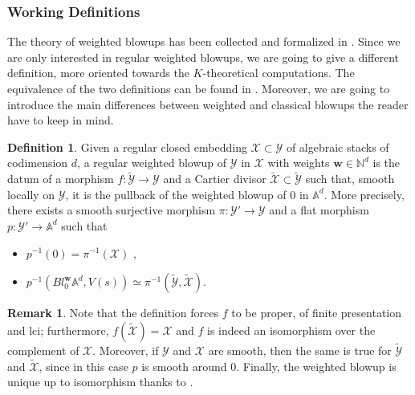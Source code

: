 \documentclass[12pt]{amsart}
\newcommand{\bA}{\mathbb{A}}
\newcommand{\bN}{\mathbb{N}}
\newcommand{\cX}{\mathcal{X}}
\newcommand{\cY}{\mathcal{Y}}
\theoremstyle{definition}
\newtheorem{Def}[theorem]{Definition}
\newtheorem{Rmk}[theorem]{Remark}
\begin{document}
\subsubsection{Working Definitions}

The theory of weighted blowups has been collected and formalized in \cite{quek-rydh-weighted-blowup}. Since we are only interested in regular weighted blowups, we are going to give a different definition, more oriented towards the $K$-theoretical computations. The equivalence of the two definitions can be found in \cite[Proposition 2.18]{italians}. Moreover, we are going to introduce the main differences between weighted and classical blowups the reader have to keep in mind.
 
\begin{Def}\label{def:weighted-blowup}
    Given a regular closed embedding $\cX\subset\cY$ of algebraic stacks of codimension $d$, a regular weighted blowup of $\cY$ in $\cX$ with weights $\mathbf{w}\in \bN^d$ is the datum of a morphism $f:\widetilde{\cY}\rightarrow\cY$ and a Cartier divisor $\widetilde{\cX}\subset\widetilde{\cY}$ such that, smooth locally on $\cY$, it is the pullback of the weighted blowup of $0$ in $\bA^d$. More precisely, there exists a smooth surjective morphism $\pi:\cY'\rightarrow\cY$ and a flat morphism $p:\cY'\rightarrow\bA^d $ such that 
    \begin{itemize}
        \item $p^{-1}(0) = \pi^{-1} (\cX)$ ,
        \item $p^{-1}(Bl_0^\mathbf{w}\bA^d,V(s)) \simeq \pi^{-1} (\widetilde{\cY},\widetilde{\cX})$.
    \end{itemize}
\end{Def}

\begin{Rmk}\label{rmk: blowus are lci}
    Note that the definition forces $f$ to be proper, of finite presentation and lci; furthermore, $f(\widetilde{\cX})=\cX$ and $f$ is indeed an isomorphism over the complement of $\cX$. Moreover, if $\cY$ and $\cX$ are smooth, then the same is true for $\widetilde{\cY}$ and $\widetilde{\cX}$, since in this case $p$ is smooth around $0$. Finally, the weighted blowup is unique up to isomorphism thanks to \cite[Theorem 3.2.9]{quek-rydh-weighted-blowup}.
\end{Rmk}
\end{document}
